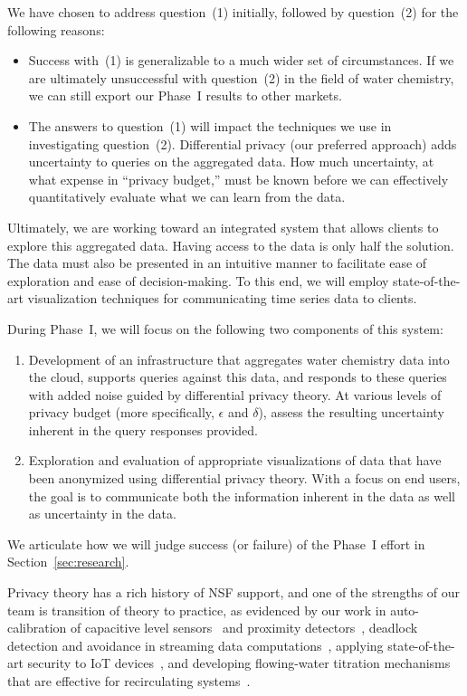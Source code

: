 We have chosen to address question~(1) initially, followed by question~(2)
for the following reasons:
\begin{itemize}
\item Success with~(1) is generalizable to a much wider set of circumstances.
If we are ultimately unsuccessful with question~(2) in the field of water
chemistry, we can still export our Phase~I results to other markets.
\item The answers to question~(1) will impact the techniques we use in
investigating question~(2). Differential privacy (our preferred approach)
adds uncertainty to queries on the aggregated data. How much uncertainty, at
what expense in ``privacy budget,'' must be known before we can effectively
quantitatively evaluate what we can learn from the data.
\end{itemize}

Ultimately, we are working toward an integrated system that allows clients to explore this aggregated data.
Having access to the data is only half the solution. 
The data must also be presented in an intuitive manner to facilitate ease of exploration and ease of decision-making. 
To this end, we will employ state-of-the-art visualization techniques for communicating time series data to clients. 

During Phase~I, we will focus on the following two components of this
system:
\begin{enumerate}
\item Development of an infrastructure that aggregates water chemistry
data into the cloud, supports queries against this data, and responds to
these queries with added noise guided by differential privacy theory.
At various levels of privacy budget (more specifically,
$\epsilon$ and $\delta$), assess the resulting uncertainty inherent
in the query responses provided.
\item Exploration and evaluation of appropriate visualizations of data that have been
anonymized using differential privacy theory.  With a focus on end users,
the goal is to communicate both the information inherent in the data as well
as uncertainty in the data.
\end{enumerate}
We articulate how we will judge success (or failure) of the Phase~I effort
in Section~\ref{sec:research}.

Privacy theory has a rich history of NSF support, and
one of the strengths of our team is
transition of theory to practice, as evidenced by our work in
auto-calibration of capacitive level sensors~\cite{lc03}
and proximity detectors~\cite{prox},
deadlock detection and avoidance in streaming data computations~\cite{labcl10},
applying state-of-the-art security to IoT devices~\cite{ccgss16,ccgss18},
and developing flowing-water titration mechanisms that are effective
for recirculating systems~\cite{cesw18,cew18}.

